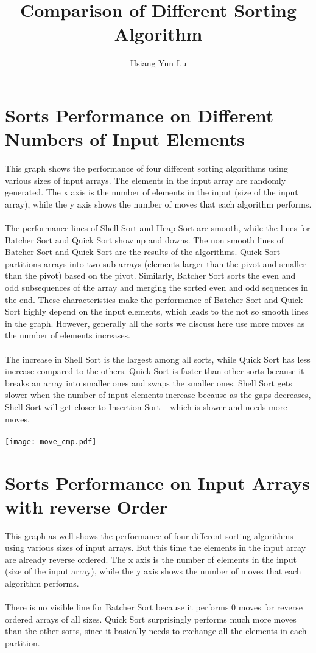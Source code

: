 \documentclass[12pt]{article}
\title{Comparison of Different Sorting Algorithm}
\author{Hsiang Yun Lu}
\begin{document}
\maketitle

\section{Sorts Performance on Different Numbers of Input Elements}

This graph shows the performance of four different sorting algorithms using various sizes of input arrays. The elements in the input array are randomly generated. The x axis is the number of elements in the input (size of the input array), while the y axis shows the number of moves that each algorithm performs. \\
\\
The performance lines of Shell Sort and Heap Sort are smooth, while the lines for Batcher Sort and Quick Sort show up and downs. The non smooth lines of Batcher Sort and Quick Sort are the results of the algorithms. Quick Sort partitions arrays into two sub-arrays (elements larger than the pivot and smaller than the pivot) based on the pivot. Similarly, Batcher Sort sorts the even and odd subsequences of the array and merging the sorted even and odd sequences in the end. These characteristics make the performance of Batcher Sort and Quick Sort highly depend on the input elements, which leads to the not so smooth lines in the graph. However, generally all the sorts we discuss here use more moves as the number of elements increases.  \\
\\
The increase in Shell Sort is the largest among all sorts, while Quick Sort has less increase compared to the others. Quick Sort is faster than other sorts because it breaks an array into smaller ones and swaps the smaller ones. Shell Sort gets slower when the number of input elements increase because as the gaps decreases, Shell Sort will get closer to Insertion Sort -- which is slower and needs more moves. \\
\\
\texttt{[image: move\_cmp.pdf]}

\section{Sorts Performance on Input Arrays with reverse Order}

This graph as well shows the performance of four different sorting algorithms using various sizes of input arrays. But this time the elements in the input array are already reverse ordered. The x axis is the number of elements in the input (size of the input array), while the y axis shows the number of moves that each algorithm performs. \\
\\
There is no visible line for Batcher Sort because it performs 0 moves for reverse ordered arrays of all sizes. Quick Sort surprisingly performs much more moves than the other sorts, since it basically needs to exchange all the elements in each partition. \\
\\
\end{document}
